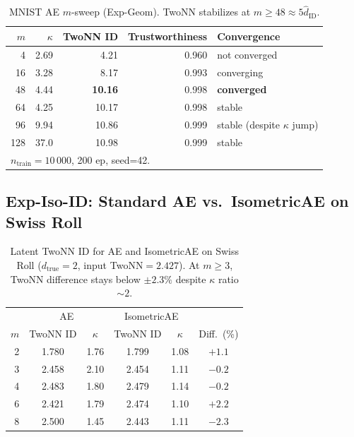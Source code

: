 \documentclass[make,article,submit,pdftex,moreauthors]{Definitions/mdpi}
\newcommand{\kap}{\kappa}
\newcommand{\hatdID}{\hat{d}_{\mathrm{ID}}}
\begin{document}
\begin{table}[H]
\centering
\caption{MNIST AE $m$-sweep (Exp-Geom). TwoNN stabilizes at $m\geq48\approx5\hatdID$.}
\label{tab:eq_mnist}
\small
\begin{tabular}{rrrrl}
\toprule
$m$ & $\kap$ & TwoNN ID & Trustworthiness & Convergence \\
\midrule
 4  & 2.69 & 4.21 & 0.960 & not converged \\
16  & 3.28 & 8.17 & 0.993 & converging \\
48  & 4.44 & \textbf{10.16} & 0.998 & \textbf{converged} \\
64  & 4.25 & 10.17 & 0.998 & stable \\
96  & 9.94 & 10.86 & 0.999 & stable (despite $\kap$ jump) \\
128 & 37.0 & 10.98 & 0.999 & stable \\
\midrule
\multicolumn{5}{l}{\small $n_{\mathrm{train}}=10\,000$, 200 ep, seed=42.} \\
\bottomrule
\end{tabular}
\end{table}

\subsection{Exp-Iso-ID: Standard AE vs.\ IsometricAE on Swiss Roll}

\begin{table}[H]
\centering
\caption{Latent TwoNN ID for AE and IsometricAE on Swiss Roll
($d_{\mathrm{true}}=2$, input TwoNN$=2.427$).
At $m\geq3$, TwoNN difference stays below $\pm2.3\%$ despite $\kap$ ratio $\sim2$.}
\label{tab:iso_id}
\small
\begin{tabular}{r cc | cc | c}
\toprule
 & \multicolumn{2}{c|}{AE} & \multicolumn{2}{c|}{IsometricAE} & \\
$m$ & TwoNN ID & $\kap$ & TwoNN ID & $\kap$ & Diff.\ (\%) \\
\midrule
2 & 1.780 & 1.76 & 1.799 & 1.08 & $+1.1$ \\
3 & 2.458 & 2.10 & 2.454 & 1.11 & $-0.2$ \\
4 & 2.483 & 1.80 & 2.479 & 1.14 & $-0.2$ \\
6 & 2.421 & 1.79 & 2.474 & 1.10 & $+2.2$ \\
8 & 2.500 & 1.45 & 2.443 & 1.11 & $-2.3$ \\
\bottomrule
\end{tabular}
\end{table}
\end{document}
